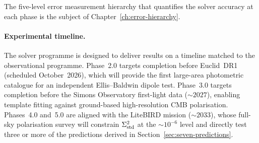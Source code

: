 The five-level error measurement hierarchy that
quantifies the solver accuracy at each phase is the
subject of Chapter~\ref{ch:error-hierarchy}.


\paragraph{Experimental timeline.}

The solver programme is designed to deliver results on a
timeline matched to the observational programme.
Phase~2.0 targets completion before Euclid~DR1
(scheduled October~2026), which will provide the first
large-area photometric catalogue for an independent
Ellis--Baldwin dipole test.  Phase~3.0 targets
completion before the Simons Observatory first-light
data ($\sim\!2027$), enabling template fitting against
ground-based high-resolution CMB polarisation.
Phases~4.0 and~5.0 are aligned with the LiteBIRD
mission ($\sim\!2033$), whose full-sky polarisation
survey will constrain $\Sigma^2_{\mathrm{std}}$ at the
$\sim\!10^{-6}$ level and directly test three or more
of the predictions derived in
Section~\ref{sec:seven-predictions}.



